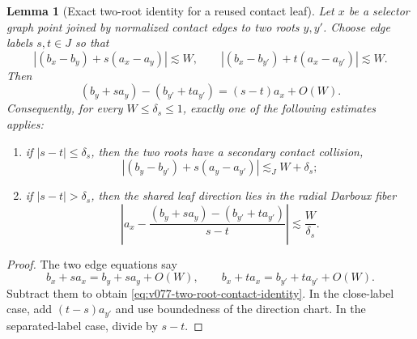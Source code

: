 \documentclass[10pt]{article}
\newtheorem{lemma}[theorem]{Lemma}
\begin{document}
\begin{lemma}[Exact two-root identity for a reused contact leaf]
\label{lem:v077-two-root-contact-identity}
Let \(x\) be a selector graph point joined by normalized contact edges to two roots \(y,y'\).
Choose edge labels \(s,t\in J\) so that
\[
|(b_x-b_y)+s(a_x-a_y)|\lesssim W,
\qquad
|(b_x-b_{y'})+t(a_x-a_{y'})|\lesssim W.
\]
Then
\begin{equation}
\label{eq:v077-two-root-contact-identity}
\boxed{
(b_y+s a_y)-(b_{y'}+t a_{y'})
=(s-t)a_x+O(W).
}
\end{equation}
Consequently, for every \(W\le\delta_s\le1\), exactly one of the following estimates applies:
\begin{enumerate}[label=\textnormal{(\roman*)}]
\item if \(|s-t|\le\delta_s\), then the two roots have a secondary contact collision,
  \begin{equation}
  \label{eq:v077-close-label-root-recollision}
  \boxed{
  |(b_y-b_{y'})+s(a_y-a_{y'})|
  \lesssim_J W+\delta_s;
  }
  \end{equation}
\item if \(|s-t|>\delta_s\), then the shared leaf direction lies in the radial Darboux fiber
  \begin{equation}
  \label{eq:v077-separated-label-radial-fiber}
  \boxed{
  \left|
  a_x-
  \frac{(b_y+s a_y)-(b_{y'}+t a_{y'})}{s-t}
  \right|
  \lesssim
  \frac W{\delta_s}.
  }
  \end{equation}
\end{enumerate}
\end{lemma}

\begin{proof}
The two edge equations say
\[
b_x+s a_x=b_y+s a_y+O(W),
\qquad
b_x+t a_x=b_{y'}+t a_{y'}+O(W).
\]
Subtract them to obtain \eqref{eq:v077-two-root-contact-identity}.  In the close-label case, add
\((t-s)a_{y'}\) and use boundedness of the direction chart.  In the separated-label case, divide
by \(s-t\).
\end{proof}
\end{document}
